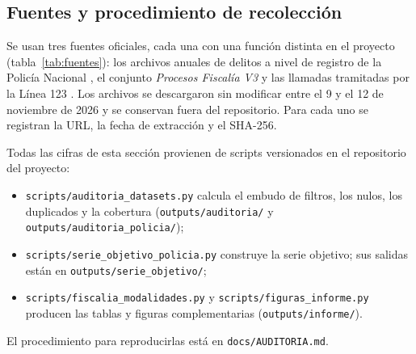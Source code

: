 \documentclass[12pt,letterpaper]{article}
\begin{document}
\subsection{Fuentes y procedimiento de recolección}

Se usan tres fuentes oficiales, cada una con una función distinta en el proyecto (tabla~\ref{tab:fuentes}): los archivos anuales de delitos a nivel de registro de la Policía Nacional \citep{policia}, el conjunto \emph{Procesos Fiscalía V3} \citep{fiscalia} y las llamadas tramitadas por la Línea 123 \citep{linea123}. Los archivos se descargaron sin modificar entre el 9 y el 12 de noviembre de 2026 y se conservan fuera del repositorio. Para cada uno se registran la URL, la fecha de extracción y el SHA-256.

Todas las cifras de esta sección provienen de scripts versionados en el repositorio del proyecto:
\begin{itemize}
  \item \texttt{scripts/auditoria\_datasets.py} calcula el embudo de filtros, los nulos, los duplicados y la cobertura (\texttt{outputs/auditoria/} y \texttt{outputs/auditoria\_policia/});
  \item \texttt{scripts/serie\_objetivo\_policia.py} construye la serie objetivo; sus salidas están en \texttt{outputs/serie\_objetivo/};
  \item \texttt{scripts/fiscalia\_modalidades.py} y \texttt{scripts/figuras\_informe.py} producen las tablas y figuras complementarias (\texttt{outputs/informe/}).
\end{itemize}
El procedimiento para reproducirlas está en \texttt{docs/AUDITORIA.md}.
\end{document}
